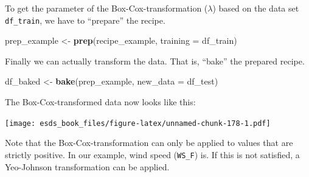 \documentclass[
]{book}
\newenvironment{Shaded}{\begin{snugshade}}{\end{snugshade}}
\newcommand{\DataTypeTok}[1]{\textcolor[rgb]{0.13,0.29,0.53}{#1}}
\newcommand{\KeywordTok}[1]{\textcolor[rgb]{0.13,0.29,0.53}{\textbf{#1}}}
\newcommand{\NormalTok}[1]{#1}
\newcommand{\OperatorTok}[1]{\textcolor[rgb]{0.81,0.36,0.00}{\textbf{#1}}}
\newcommand{\StringTok}[1]{\textcolor[rgb]{0.31,0.60,0.02}{#1}}
\begin{document}
To get the parameter of the Box-Cox-transformation (\(\lambda\)) based on the data set \texttt{df\_train}, we have to ``prepare'' the recipe.

\begin{Shaded}
\begin{Highlighting}[]
\NormalTok{prep_example <-}\StringTok{ }\KeywordTok{prep}\NormalTok{(recipe_example, }\DataTypeTok{training =}\NormalTok{ df_train) }
\end{Highlighting}
\end{Shaded}

Finally we can actually transform the data. That is, ``bake'' the prepared recipe.

\begin{Shaded}
\begin{Highlighting}[]
\NormalTok{df_baked <-}\StringTok{ }\KeywordTok{bake}\NormalTok{(prep_example, }\DataTypeTok{new_data =}\NormalTok{ df_test)}
\end{Highlighting}
\end{Shaded}

The Box-Cox-transformed data now looks like this:

\begin{Shaded}
\end{Shaded}

\texttt{[image: esds\_book\_files/figure-latex/unnamed-chunk-178-1.pdf]}

Note that the Box-Cox-transformation can only be applied to values that are strictly positive. In our example, wind speed (\texttt{WS\_F}) is. If this is not satisfied, a Yeo-Johnson transformation can be applied.

\begin{Shaded}
\end{Shaded}
\end{document}
